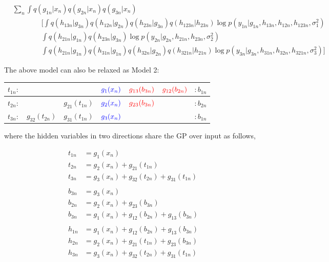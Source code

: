 \documentclass{article}
\begin{document}
\begin{align*}
	& \sum_n \int q(g_{1n}|x_n)q(g_{2n}|x_n)q(g_{3n}|x_n)\\
	& \hspace{4em} \bigg[ \int  q(h_{13n}|g_{3n}) q(h_{12n}|g_{2n}) q(h_{23n}|g_{3n}) q(h_{123n}|h_{23n}) \log p(y_{1n}|g_{1n}, h_{13n}, h_{12n}, h_{123n}, \sigma_1^2)\\
	& \hspace{4em} \int q(h_{21n}|g_{1n}) q(h_{23n}|g_{3n}) \log p(y_{2n}|g_{2n}, h_{21n}, h_{23n}, \sigma^2_2)\\
	& \hspace{4em} \int q(h_{21n}|g_{1n}) q(h_{31n}|g_{1n}) q(h_{32n}|g_{2n}) q(h_{321n}|h_{21n}) \log p(y_{3n}| g_{3n}, h_{31n}, h_{32n}, h_{321n}, \sigma^2_3) \bigg]
\end{align*}

The above model can also be relaxed as Model 2:
\begin{table}[H]
\centering
\begin{tabular}{|c|c|c|c|c|c|c|}
	\hline
	$t_{1n}:$ & & & $\color{blue} g_1(x_n)$ & $\color{red} g_{13}(b_{3n})$ & $\color{red} g_{12}(b_{2n})$  & $:b_{1n}$\\
	\hline
	$t_{2n}:$ & & $g_{21}(t_{1n})$ & $\color{blue} g_2(x_n)$ & $\color{red} g_{23}(b_{3n})$ &  & $:b_{2n}$\\
	\hline
	$t_{3n}:$ &$g_{32}(t_{2n})$ & $g_{31}(t_{1n})$ & $\color{blue} g_3(x_n)$ &  &  & $:b_{1n}$\\
	\hline
\end{tabular}
\end{table}

where the hidden variables in two directions share the GP over input as follows,

\begin{align*}
	t_{1n} &= g_1(x_n)\\
	t_{2n} &= g_2(x_n) + g_{21}(t_{1n})\\
	t_{3n} &= g_3(x_n) + g_{32}(t_{2n}) + g_{31}(t_{1n})\\
	\\
	b_{3n} &= g_3(x_n)\\
	b_{2n} &= g_2(x_n) + g_{23}(b_{3n})\\
	b_{3n} &= g_1(x_n) + g_{12}(b_{2n}) + g_{13}(b_{3n})\\
	\\
	h_{1n} &= g_1(x_n) + g_{12}(b_{2n}) + g_{13}(b_{3n})\\
	h_{2n} &= g_2(x_n) + g_{21}(t_{1n}) + g_{23}(b_{3n})\\
	h_{3n} &= g_3(x_n) + g_{32}(t_{2n}) + g_{31}(t_{1n})
\end{align*}
\end{document}
